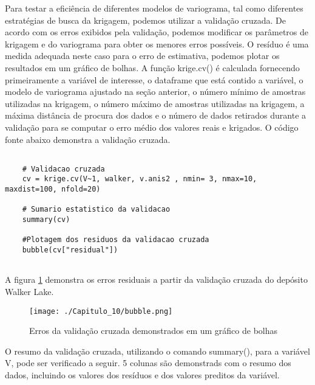 Para testar a eficiência de diferentes modelos de variograma, tal como diferentes estratégias de busca da krigagem, podemos utilizar a validação cruzada. De acordo com os erros exibidos pela validação, podemos modificar os parâmetros de krigagem e do variograma para obter os menores erros possíveis. O resíduo é uma medida adequada neste caso para o erro de estimativa, podemos plotar os resultados em um gráfico de bolhas. A função krige.cv() é calculada fornecendo primeiramente a variável de interesse, o dataframe que está contido a variável, o modelo de variograma ajustado na seção anterior, o número mínimo de amostras utilizadas na krigagem, o número máximo de amostras utilizadas na krigagem, a máxima distância de procura dos dados e o número de dados retirados durante a validação para se computar o erro médio dos valores reais e krigados. O código fonte abaixo demonstra a validação cruzada.  

\begin{scriptsize}
	\estiloR
	\begin{lstlisting}[]
	
	# Validacao cruzada
	cv = krige.cv(V~1, walker, v.anis2 , nmin= 3, nmax=10, maxdist=100, nfold=20)
	
	# Sumario estatistico da validacao
	summary(cv)
	
	#Plotagem dos residuos da validacao cruzada
	bubble(cv["residual"])
	
	\end{lstlisting}
\end{scriptsize}

A figura \ref{Validacao_cruzada} demonstra os erros residuais a partir da validação cruzada do depósito Walker Lake. 

\FloatBarrier
\begin{figure}[H]
	\centering
	\texttt{[image: ./Capitulo\_10/bubble.png]}	
	\caption{Erros da validação cruzada demonstrados em um gráfico de bolhas}
	\label{Validacao_cruzada}
\end{figure}
\FloatBarrier

O resumo da validação cruzada, utilizando o comando summary(), para a variável V, pode ser verificado a seguir. 5 colunas são demonstrads com o resumo dos dados, incluindo os valores dos resíduos e dos valores preditos da variável. 

\begingroup
\begin{footnotesize}

\end{footnotesize}
\endgroup

